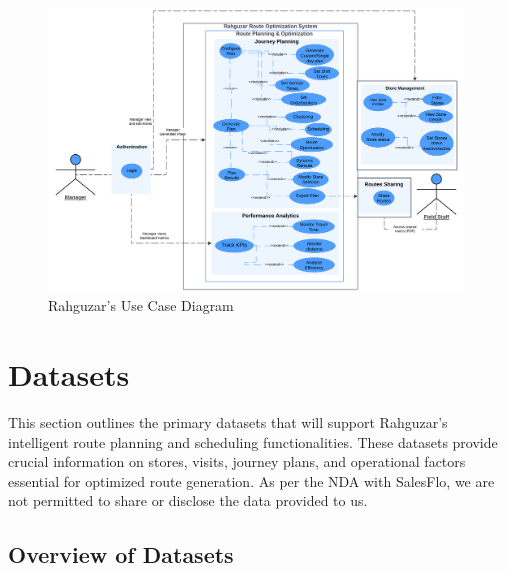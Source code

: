 \begin{center}

    \begin{figure}[H]
        \centering
        \includegraphics[width=0.98\textwidth]{images/Rahguzar - Use Case - Core System.png} 
        \caption{Rahguzar's Use Case Diagram}
    \end{figure}
\end{center}

\section{Datasets}
This section outlines the primary datasets that will support Rahguzar’s intelligent route planning and scheduling functionalities. These datasets provide crucial information on stores, visits, journey plans, and operational factors essential for optimized route generation. As per the NDA with SalesFlo, we are not permitted to share or disclose the data provided to us. 
\subsection*{Overview of Datasets}

